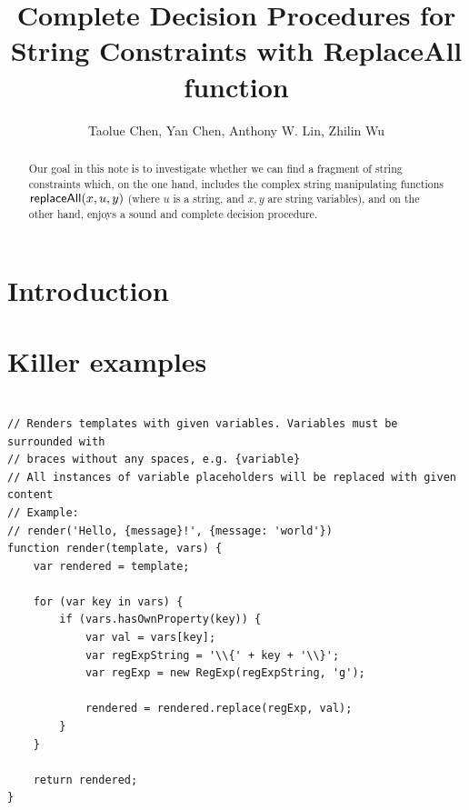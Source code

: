 \documentclass{llncs}
\title{Complete Decision Procedures for \\
String Constraints with ReplaceAll function}
\author{}
\institute{}
\author{Taolue Chen, Yan Chen, Anthony W. Lin, Zhilin Wu}
\begin{document}
\maketitle


\begin{abstract}
Our goal in this note is to investigate whether we can find a fragment of string constraints which, on the one hand, includes the complex string manipulating functions $\mathsf{replaceAll}(x, u, y)$ (where $u$ is a string, and $x,y$ are string variables), and on the other hand, enjoys a sound and complete decision procedure.
\end{abstract}

\newcommand{\concat} {\circ}

\newcommand{\replace} {{\sf replace}}

\newcommand{\str} {{\sf Str}}

\newcommand{\intnum} {{\sf Int}}

\newcommand{\regexp} {{\sf RegExp}}

\newcommand{\strarr} {{\sf StringArray}}

\newcommand{\dtypes} {{\sf DataTypes}}

\newcommand{\anarr} {{\mathbb{A}}}

\section{Introduction}

\cite{LB16,TCJ16,YABI14}

\section{Killer examples}


\begin{verbatim}

// Renders templates with given variables. Variables must be surrounded with
// braces without any spaces, e.g. {variable}
// All instances of variable placeholders will be replaced with given content
// Example:
// render('Hello, {message}!', {message: 'world'})
function render(template, vars) {
    var rendered = template;

    for (var key in vars) {
        if (vars.hasOwnProperty(key)) {
            var val = vars[key];
            var regExpString = '\\{' + key + '\\}';
            var regExp = new RegExp(regExpString, 'g');

            rendered = rendered.replace(regExp, val);
        }
    }

    return rendered;
}
\end{verbatim}
\end{document}
